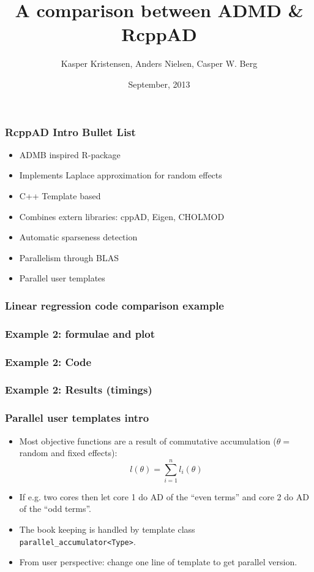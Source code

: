 \documentclass[compress]{beamer}
\title[RcppAD]
{A comparison between ADMD \& RcppAD}
\author[K. Kristensen, A. Nielsen, C.W. Berg ]%
{Kasper Kristensen, Anders Nielsen, Casper W. Berg}
\date[September 2013] %
{September, 2013}
\begin{document}
\begin{frame}[plain]
  \titlepage
\end{frame}

\begin{frame}
\frametitle{RcppAD Intro Bullet List}

\begin{itemize}
  \item ADMB inspired R-package
  \item Implements Laplace approximation for random effects
  \item C++ Template based
  \item Combines extern libraries: cppAD, Eigen, CHOLMOD
  \item Automatic sparseness detection
  \item Parallelism through BLAS
  \item Parallel user templates
\end{itemize}


\end{frame}

\begin{frame}
  \frametitle{Linear regression code comparison example}
\end{frame}


\begin{frame}
  \frametitle{Example 2: formulae and plot}
\end{frame}

\begin{frame}
  \frametitle{Example 2: Code}
\end{frame}

\begin{frame}
  \frametitle{Example 2: Results (timings)}
\end{frame}

\begin{frame}
  \frametitle{Parallel user templates intro}
  \begin{itemize}
  \item Most objective functions are a result of commutative
    accumulation ($\theta=$ random and fixed effects):
    \[l(\theta) = \sum_{i=1}^n l_i(\theta)\]
  \item If e.g. two cores then let core 1 do AD of the ``even terms'' and
    core 2 do AD of the ``odd terms''.
  \item The book keeping is handled by template class
    \texttt{parallel\_accumulator<Type>}.
  \item From user perspective: change one line of template to get
    parallel version.
  \end{itemize}
\end{frame}
\end{document}
